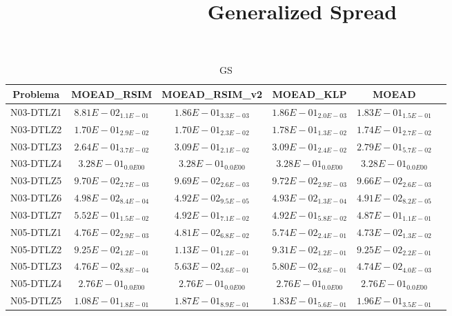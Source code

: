 \documentclass{article}
\title{Generalized Spread}
\author{}
\begin{document}
\maketitle
\begin{table*}[ht!]
\scriptsize
\caption{GS}
\centering\begin{tabular}{|c||c||c||c||c||c|} \hline
Problema &MOEAD_RSIM &MOEAD_RSIM_v2 &MOEAD_KLP &MOEAD\\\hline
N03-DTLZ1 &\cellcolor{gray95}$8.81E-02_{1.1E-01}$ &$1.86E-01_{3.3E-03}$ &$1.86E-01_{2.0E-03}$ &\cellcolor{gray25}$1.83E-01_{1.5E-01}$\\ 
\hline
N03-DTLZ2 &\cellcolor{gray95}$1.70E-01_{2.9E-02}$ &\cellcolor{gray25}$1.70E-01_{2.3E-02}$ &$1.78E-01_{1.3E-02}$ &$1.74E-01_{2.7E-02}$\\ 
\hline
N03-DTLZ3 &\cellcolor{gray95}$2.64E-01_{3.7E-02}$ &$3.09E-01_{2.1E-02}$ &$3.09E-01_{2.4E-02}$ &\cellcolor{gray25}$2.79E-01_{5.7E-02}$\\ 
\hline
N03-DTLZ4 &\cellcolor{gray95}$3.28E-01_{0.0E00}$ &\cellcolor{gray25}$3.28E-01_{0.0E00}$ &$3.28E-01_{0.0E00}$ &$3.28E-01_{0.0E00}$\\ 
\hline
N03-DTLZ5 &$9.70E-02_{2.7E-03}$ &\cellcolor{gray25}$9.69E-02_{2.6E-03}$ &$9.72E-02_{2.9E-03}$ &\cellcolor{gray95}$9.66E-02_{2.6E-03}$\\ 
\hline
N03-DTLZ6 &$4.98E-02_{8.4E-04}$ &\cellcolor{gray25}$4.92E-02_{9.5E-05}$ &$4.93E-02_{1.3E-04}$ &\cellcolor{gray95}$4.91E-02_{8.2E-05}$\\ 
\hline
N03-DTLZ7 &$5.52E-01_{1.5E-02}$ &$4.92E-01_{7.1E-02}$ &\cellcolor{gray25}$4.92E-01_{5.8E-02}$ &\cellcolor{gray95}$4.87E-01_{1.1E-01}$\\ 
\hline
N05-DTLZ1 &\cellcolor{gray25}$4.76E-02_{2.9E-03}$ &$4.81E-02_{6.8E-02}$ &$5.74E-02_{2.4E-01}$ &\cellcolor{gray95}$4.73E-02_{1.3E-02}$\\ 
\hline
N05-DTLZ2 &\cellcolor{gray95}$9.25E-02_{1.2E-01}$ &$1.13E-01_{1.2E-01}$ &$9.31E-02_{1.2E-01}$ &\cellcolor{gray25}$9.25E-02_{2.2E-01}$\\ 
\hline
N05-DTLZ3 &\cellcolor{gray25}$4.76E-02_{8.8E-04}$ &$5.63E-02_{3.6E-01}$ &$5.80E-02_{3.6E-01}$ &\cellcolor{gray95}$4.74E-02_{4.0E-03}$\\ 
\hline
N05-DTLZ4 &\cellcolor{gray95}$2.76E-01_{0.0E00}$ &\cellcolor{gray25}$2.76E-01_{0.0E00}$ &$2.76E-01_{0.0E00}$ &$2.76E-01_{0.0E00}$\\ 
\hline
N05-DTLZ5 &\cellcolor{gray95}$1.08E-01_{1.8E-01}$ &$1.87E-01_{8.9E-01}$ &\cellcolor{gray25}$1.83E-01_{5.6E-01}$ &$1.96E-01_{3.5E-01}$\\ 

\end{tabular}
\end{table*}
\end{document}
